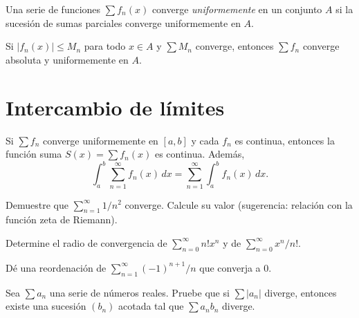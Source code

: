 \begin{definition}
\label{def:convergencia-uniforme}
Una serie de funciones $\sum f_n(x)$ converge \emph{uniformemente} en un conjunto $A$ si la sucesión de sumas parciales converge uniformemente en $A$.
\end{definition}

\begin{theorem}[Weierstrass $M$]
\label{teo:weierstrass-m}
Si $|f_n(x)|\leq M_n$ para todo $x\in A$ y $\sum M_n$ converge, entonces $\sum f_n$ converge absoluta y uniformemente en $A$.
\end{theorem}

\section{Intercambio de límites}

\begin{theorem}
\label{teo:intercambio}
Si $\sum f_n$ converge uniformemente en $[a,b]$ y cada $f_n$ es continua, entonces la función suma $S(x)=\sum f_n(x)$ es continua. Además,
\[
  \int_a^b\sum_{n=1}^{\infty}f_n(x)\,dx=\sum_{n=1}^{\infty}\int_a^bf_n(x)\,dx.
\]
\end{theorem}

\begin{exercise}
Demuestre que $\sum_{n=1}^{\infty}1/n^2$ converge. Calcule su valor (sugerencia: relación con la función zeta de Riemann).
\end{exercise}

\begin{exercise}
Determine el radio de convergencia de $\sum_{n=0}^{\infty}n!x^n$ y de $\sum_{n=0}^{\infty}x^n/n!$.
\end{exercise}

\begin{exercise}
Dé una reordenación de $\sum_{n=1}^{\infty}(-1)^{n+1}/n$ que converja a $0$.
\end{exercise}

\begin{problem}
Sea $\sum a_n$ una serie de números reales. Pruebe que si $\sum|a_n|$ diverge, entonces existe una sucesión $(b_n)$ acotada tal que $\sum a_nb_n$ diverge.
\end{problem}
